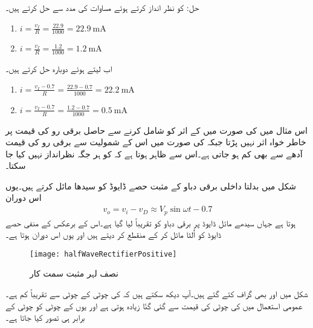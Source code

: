حل:	 کو نظر انداز کرتے ہوئے مساوات   کی مدد سے حل کرتے ہیں۔
\begin{enumerate}
\item
$i=\frac{v_I}{R}=\frac{22.9}{1000}=\SI{22.9}{\milli \ampere}$
\item
$i=\frac{v_I}{R}=\frac{1.2}{1000}=\SI{1.2}{\milli \ampere}$
\end{enumerate}
اب  لیتے ہوئے دوبارہ حل کرتے ہیں۔
\begin{enumerate}
\item
$i=\frac{v_I-0.7}{R}=\frac{22.9-0.7}{1000}=\SI{22.2}{\milli \ampere}$
\item
$i=\frac{v_I-0.7}{R}=\frac{1.2-0.7}{1000}=\SI{0.5}{\milli \ampere}$
\end{enumerate}


اس مثال میں  کی صورت میں  کے اثر کو شامل کرنے سے حاصل برقی رو   کی قیمت پر خاطر خواہ اثر نہیں پڑتا جبکہ کی صورت میں اس کے شمولیت سے برقی رو کی قیمت آدھے سے بھی کم ہو جاتی ہے۔اس سے ظاہر ہوتا ہے کہ  کو ہر جگہ نظرانداز نہیں کیا جا سکتا۔

 
	شکل   میں بدلتا داخلی برقی دباو   کے مثبت حصے ڈایوڈ  کو سیدھا مائل کرتے ہیں۔یوں اس دوران
\begin{align*}
v_o = v_i  - v_D \approx V_p \sin \omega t  - 0.7
\end{align*}
ہوتا ہے جہاں سیدھے مائل ڈایوڈ پر برقی دباو کو تقریباً  لیا گیا ہے۔اس کے برعکس   کے منفی حصے ڈایوڈ کو اُلٹا مائل کر کے منقطع کر دیتے ہیں اور یوں اس دوران   ہوتا ہے۔
\begin{figure}
\centering
\texttt{[image: halfWaveRectifierPositive]}
\caption{نصف لہر مثبت سمت کار}
\label{شکل_نصف_لہر_مثبت_سمت_کار}
\end{figure}
شکل  میں   اور  بھی گراف کئے گئے ہیں۔آپ دیکھ سکتے ہیں کہ   کی چوٹی  کے چوٹی سے تقریباً  کم ہے۔عمومی استعمال میں  کی چوٹی کی قیمت  سے گئی گنّا زیادہ ہوتی ہے اور یوں  کے چوٹی کو  چوٹی کے برابر ہی تصور کیا جاتا ہے۔

